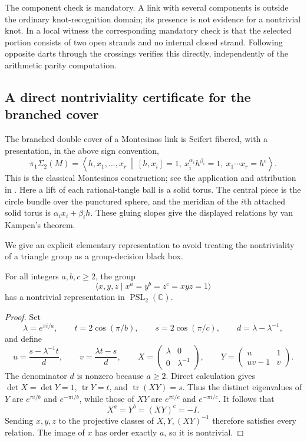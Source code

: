 The component check is mandatory.  A link with several components is outside
the ordinary knot-recognition domain; its presence is not evidence for a
nontrivial knot.  In a local witness the corresponding mandatory check is that
the selected portion consists of two open strands and no internal closed
strand.  Following opposite darts through the crossings verifies this directly,
independently of the arithmetic parity computation.

\subsection{A direct nontriviality certificate for the branched cover}

The branched double cover of a Montesinos link is Seifert fibered, with a
presentation, in the above sign convention,
\begin{equation}\label{eq:mon:sfs-group}
 \pi_1\Sigma_2(M)=
 \left\langle h,x_1,\ldots,x_r\ \middle|\
 [h,x_i]=1,\ x_i^{\alpha_i}h^{\beta_i}=1,
 \ x_1\cdots x_r=h^e\right\rangle.
\end{equation}
This is the classical Montesinos construction; see the application and
attribution in \cite[proof of Theorem~4.9]{nogueira-salgueiro}.
Here a lift of each rational-tangle ball is a solid torus.  The central piece
is the circle bundle over the punctured sphere, and the meridian of the
$i$th attached solid torus is $\alpha_i x_i+\beta_i h$.  These gluing slopes
give the displayed relations by van Kampen's theorem.

We give an explicit elementary representation to avoid treating the
nontriviality of a triangle group as a group-decision black box.

\begin{lemma}
\label{lem:mon:triangle}
For all integers $a,b,c\ge2$, the group
\[
 \langle x,y,z\mid x^a=y^b=z^c=xyz=1\rangle
\]
has a nontrivial representation in $\operatorname{PSL}_2(\mathbb C)$.
\end{lemma}

\begin{proof}
Set
\[
 \lambda=e^{\pi i/a},\qquad t=2\cos(\pi/b),\qquad
 s=2\cos(\pi/c),\qquad d=\lambda-\lambda^{-1},
\]
and define
\[
 u=\frac{s-\lambda^{-1}t}{d},\qquad
 v=\frac{\lambda t-s}{d},\qquad
 X=\begin{pmatrix}\lambda&0\\0&\lambda^{-1}\end{pmatrix},\qquad
 Y=\begin{pmatrix}u&1\\uv-1&v\end{pmatrix}.
\]
The denominator $d$ is nonzero because $a\ge2$.  Direct calculation gives
$\det X=\det Y=1$, $\operatorname{tr}Y=t$, and
$\operatorname{tr}(XY)=s$.  Thus the distinct eigenvalues of $Y$ are
$e^{\pi i/b}$ and $e^{-\pi i/b}$, while those of $XY$ are
$e^{\pi i/c}$ and $e^{-\pi i/c}$.  It follows that
\[
 X^a=Y^b=(XY)^c=-I.
\]
Sending $x,y,z$ to the projective classes of $X,Y,(XY)^{-1}$ therefore
satisfies every relation.  The image of $x$ has order exactly $a$, so it is
nontrivial.
\end{proof}

